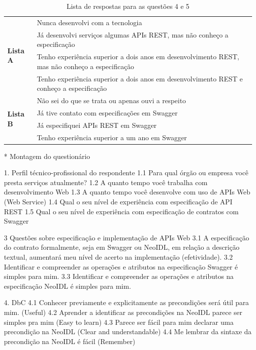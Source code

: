 \begin{table}[!bth]
\centering
\vspace{0.5cm}
\begin{tabular}{p{1.5cm}|p{13cm}}
\hline    
\multirow{4}{*}{\textbf{Lista A}} & Nunca desenvolvi com a tecnologia \\
& Já desenvolvi serviços algumas APIs REST, mas não conheço a
especificação \\
& Tenho experiência superior a dois anos em desenvolvimento REST, mas não conheço
a especificação \\
& Tenho experiência superior a dois anos em desenvolvimento REST e conheço a
especificação \\
\hline
\multirow{4}{*}{\textbf{Lista B}} & Não sei do que se trata ou apenas ouvi a
respeito\\
 & Já tive contato com especificações em Swagger \\
 & Já especifiquei APIs REST em Swagger\\
 & Tenho experiência superior a um ano em Swagger \\

\end{tabular}
\caption{Lista de respostas para as questões 4 e 5}
\label{respostasQ4e5}
\end{table}



* Montagem do questionário

1. Perfil técnico-profissional do respondente
1.1 Para qual órgão ou empresa você presta serviços atualmente?
1.2 A quanto tempo você trabalha com desenvolvimento Web
1.3 A quanto tempo você desenvolve com uso de APIs Web (Web Service)
1.4 Qual o seu nível de experiência com especificação de API REST
1.5 Qual o seu nível de experiência com especificação de contratos com Swagger

3 Questões sobre especificação e implementação de APIs Web
3.1 A especificação do contrato formalmente, seja em Swagger ou NeoIDL, em
relação a descrição textual, aumentará meu nível de acerto na implementação (efetividade).
3.2 Identificar e compreender as operações e atributos na especificação Swagger
é simples para mim.
3.3 Identificar e compreender as operações e atributos na especificação NeoIDL é
simples para mim.

4. DbC
4.1 Conhecer previamente e explicitamente as precondições será útil para mim.
(Useful)
4.2 Aprender a identificar as precondições na NeoIDL parece ser simples pra mim
(Easy to learn)
4.3 Parece ser fácil para mim declarar uma precondição na NeoIDL
(Clear and understandable)
4.4 Me lembrar da sintaxe da precondição na NeoIDL é fácil  (Remember)

